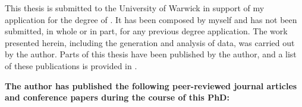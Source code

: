 \frontmatter
\titlepage
\tableofcontents
This thesis is submitted to the University of Warwick in support of my application for the degree of \thequalification. It has been composed by myself and has not been submitted, in whole or in part, for any previous degree application. The work presented herein, including the generation and analysis of data, was carried out by the author. Parts of this thesis have been published by the author, and a list of these publications is provided in . \par
 \label{chap:publications-awards}
\noindent\textbf{The author has published the following peer-reviewed journal articles and conference papers during the course of this PhD:}\par
